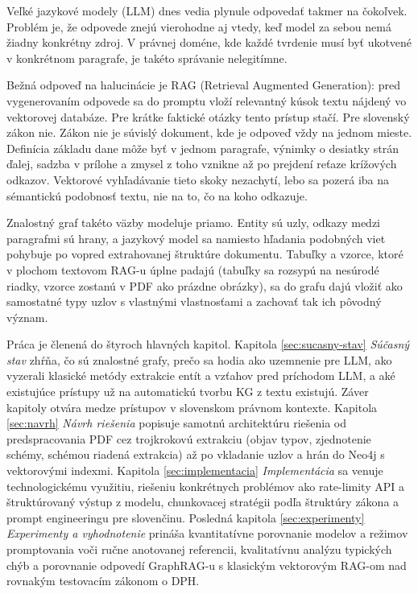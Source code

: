 Veľké jazykové modely (LLM) dnes vedia plynule odpovedať takmer na čokoľvek. Problém je, že odpovede znejú vierohodne aj vtedy, keď model za sebou nemá žiadny konkrétny zdroj. V právnej doméne, kde každé tvrdenie musí byť ukotvené v konkrétnom paragrafe, je takéto správanie nelegitímne.

Bežná odpoveď na halucinácie je RAG (Retrieval Augmented Generation): pred vygenerovaním odpovede sa do promptu vloží relevantný kúsok textu nájdený vo vektorovej databáze. Pre krátke faktické otázky tento prístup stačí. Pre slovenský zákon nie. Zákon nie je súvislý dokument, kde je odpoveď vždy na jednom mieste. Definícia základu dane môže byť v jednom paragrafe, výnimky o desiatky strán ďalej, sadzba v prílohe a zmysel z toho vznikne až po prejdení reťaze krížových odkazov. Vektorové vyhľadávanie tieto skoky nezachytí, lebo sa pozerá iba na sémantickú podobnosť textu, nie na to, čo na koho odkazuje.

Znalostný graf takéto väzby modeluje priamo. Entity sú uzly, odkazy medzi paragrafmi sú hrany, a jazykový model sa namiesto hľadania podobných viet pohybuje po vopred extrahovanej štruktúre dokumentu. Tabuľky a vzorce, ktoré v plochom textovom RAG-u úplne padajú (tabuľky sa rozsypú na nesúrodé riadky, vzorce zostanú v PDF ako prázdne obrázky), sa do grafu dajú vložiť ako samostatné typy uzlov s vlastnými vlastnosťami a zachovať tak ich pôvodný význam.

Práca je členená do štyroch hlavných kapitol. Kapitola \ref{sec:sucasny-stav} \emph{Súčasný stav} zhŕňa, čo sú znalostné grafy, prečo sa hodia ako uzemnenie pre LLM, ako vyzerali klasické metódy extrakcie entít a vzťahov pred príchodom LLM, a aké existujúce prístupy už na automatickú tvorbu KG z textu existujú. Záver kapitoly otvára medze prístupov v slovenskom právnom kontexte. Kapitola \ref{sec:navrh} \emph{Návrh riešenia} popisuje samotnú architektúru riešenia od predspracovania PDF cez trojkrokovú extrakciu (objav typov, zjednotenie schémy, schémou riadená extrakcia) až po vkladanie uzlov a hrán do Neo4j s vektorovými indexmi. Kapitola \ref{sec:implementacia} \emph{Implementácia} sa venuje technologickému využitiu, riešeniu konkrétnych problémov ako rate-limity API a štruktúrovaný výstup z modelu, chunkovacej stratégii podľa štruktúry zákona a prompt engineeringu pre slovenčinu. Posledná kapitola \ref{sec:experimenty} \emph{Experimenty a vyhodnotenie} prináša kvantitatívne porovnanie modelov a režimov promptovania voči ručne anotovanej referencii, kvalitatívnu analýzu typických chýb a porovnanie odpovedí GraphRAG-u s klasickým vektorovým RAG-om nad rovnakým testovacím zákonom o DPH.
